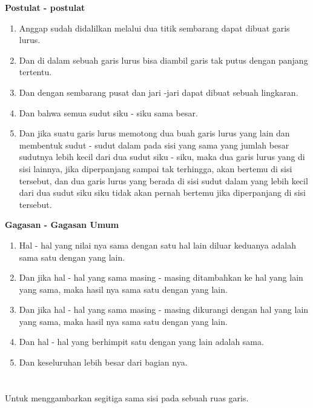 \documentclass[a4paper, 12pt]{book}
\begin{document}
\begin{center}
\textbf{Postulat - postulat}
\end{center}
\begin{enumerate}
\item Anggap sudah didalilkan melalui dua titik sembarang dapat dibuat garis lurus.
\item Dan di dalam sebuah garis lurus bisa diambil garis tak putus dengan panjang tertentu.
\item Dan dengan sembarang pusat dan jari -jari dapat dibuat sebuah lingkaran.
\item Dan bahwa semua sudut siku - siku sama besar.
\item Dan jika suatu garis lurus memotong dua buah garis lurus yang lain dan membentuk sudut - sudut dalam pada sisi yang sama yang jumlah besar sudutnya lebih kecil dari dua  sudut siku - siku, maka dua garis lurus yang di sisi lainnya, jika diperpanjang sampai tak terhingga, akan bertemu di sisi tersebut, dan dua garis lurus yang berada di sisi sudut dalam yang lebih kecil dari dua sudut siku siku tidak akan pernah bertemu jika diperpanjang di sisi tersebut.
\end{enumerate}

\begin{center}
\textbf{Gagasan - Gagasan Umum}
\end{center}
\begin{enumerate}
\item Hal - hal yang nilai nya sama dengan satu hal lain diluar keduanya adalah sama satu dengan yang lain. 
\item Dan jika hal - hal yang sama masing - masing ditambahkan ke hal yang lain yang sama, maka hasil nya sama satu dengan yang lain. 
\item Dan jika hal - hal yang sama masing - masing dikurangi dengan hal yang lain yang sama, maka hasil nya sama satu dengan yang lain. 
\item Dan hal - hal yang berhimpit satu dengan yang lain adalah sama.
\item Dan keseluruhan lebih besar dari bagian nya.
\end{enumerate}

\section*{\centering \thesection} 
Untuk menggambarkan segitiga sama sisi pada sebuah ruas garis.  

\end{document}
